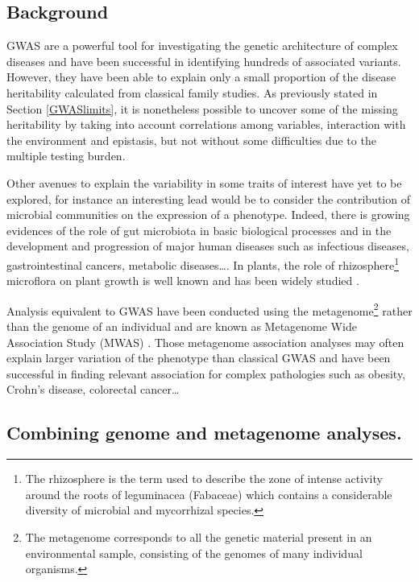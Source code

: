 \documentclass[]{book}
\let\rmarkdownfootnote\footnote%
\def\footnote{\protect\rmarkdownfootnote}
\begin{document}
\hypertarget{background-1}{%
\subsection{Background}\label{background-1}}

GWAS are a powerful tool for investigating the genetic architecture of
complex diseases and have been successful in identifying hundreds of
associated variants. However, they have been able to explain only a
small proportion of the disease heritability calculated from classical
family studies. As previously stated in Section \ref{GWASlimits},
it is nonetheless possible to uncover some of the missing heritability
by taking into account correlations among variables, interaction with
the environment and epistasis, but not without some difficulties due to
the multiple testing burden.

Other avenues to explain the variability in some traits of interest have
yet to be explored, for instance an interesting lead would be to
consider the contribution of microbial communities on the expression of
a phenotype. Indeed, there is growing evidences of the role of gut
microbiota in basic biological processes and in the development and
progression of major human diseases such as infectious diseases,
gastrointestinal cancers, metabolic diseases\ldots{}\citep{wang_2107_human}. In
plants, the role of rhizosphere\footnote{The rhizosphere is the term used to describe the zone of intense
  activity around the roots of leguminacea (Fabaceae) which contains a
  considerable diversity of microbial and mycorrhizal species.} microflora on plant growth is well
known and has been widely studied
\citep{mukerji2002techniques, pinton2007rhizosphere}.

Analysis equivalent to GWAS have been conducted using the metagenome\footnote{The metagenome corresponds to all the genetic material present in
  an environmental sample, consisting of the genomes of many
  individual organisms.}
rather than the genome of an individual and are known as Metagenome Wide
Association Study (MWAS) \citep{wang2016metagenome, segata2011metagenomic}.
Those metagenome association analyses may often explain larger variation
of the phenotype than classical GWAS and have been successful in finding
relevant association for complex pathologies such as obesity, Crohn's
disease, colorectal cancer\ldots{}

\hypertarget{combining-genome-and-metagenome-analyses.}{%
\subsection{Combining genome and metagenome analyses.}\label{combining-genome-and-metagenome-analyses.}}
\end{document}
